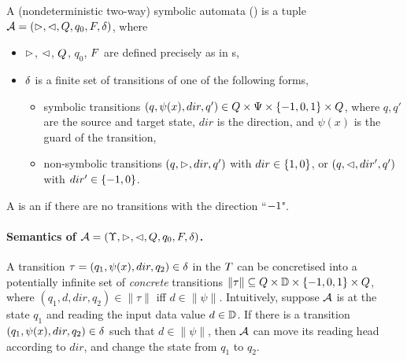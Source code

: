 \begin{definition}\label{def-2sa}
    A (nondeterministic two-way)  symbolic automata (\SSA) is a tuple $\mathcal{A} = (\vartriangleright, \vartriangleleft, Q, q_0, F, \delta)$, where  
\begin{itemize}
%
\item $\vartriangleright$, $\vartriangleleft$, $Q$, $q_0$, $F$ are defined precisely as in \FFA{}s, 
%
\item $\delta$ is a finite set of transitions of one of the following forms,
\begin{itemize}
\item     symbolic transitions $(q, \psi(x), dir, q') \in Q \times \Psi \times \{-1, 0, 1\} \times Q$, where $q, q'$ are the source and target state, $dir$ is the direction, and $\psi(x)$ is the guard of the transition, 
%
\item     non-symbolic transitions $(q, \vartriangleright, dir, q')$ with $dir \in \{1, 0\}$, or $(q, \vartriangleleft, dir', q')$ with $dir' \in \{-1,0\}$. 
\end{itemize}
\end{itemize}
A \SSA{} is an \SA{} if there are no transitions with the direction ``$-1$". 
\end{definition}

\paragraph{Semantics of \SSA{} $\mathcal{A} = (\Upsilon, \vartriangleright, \vartriangleleft, Q, q_0, F, \delta)$.}
A transition $\tau=(q_1,\psi(x), dir, q_2) \in \delta$ in the \SSA $T$ can be concretised
into a potentially infinite set of \emph{concrete} transitions $\|\tau\| \subseteq Q \times \mathbb{D} \times \{-1, 0, 1\} \times Q$, where $(q_1, d, dir, q_2)  \in \|\tau\|$ iff $d \in \|\psi\|$.
Intuitively, suppose $\mathcal{A}$ is at the state $q_1$ and reading the input data value $d \in \mathbb{D}$.
If there is a transition $(q_1, \psi(x), dir, q_2) \in \delta$ such that $d \in \|\psi\|$, then $\mathcal{A}$ can move its reading head according to $dir$, and change the state from $q_1$ to $q_2$.

